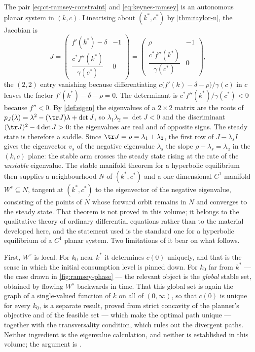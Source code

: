 \begin{remark}\label{rem:ct-saddle-path}
	The pair \eqref{eq:ct-ramsey-constraint} and \eqref{eq:keynes-ramsey} is an
	autonomous planar system in $(k,c)$. Linearising about $(k^{\ast},c^{\ast})$ by
	\autoref{thm:taylor-n}, the Jacobian is
	\[
		J=\begin{pmatrix}
			f'(k^{\ast})-\delta                            & -1 \\[2pt]
			\dfrac{c^{\ast}f''(k^{\ast})}{\gamma(c^{\ast})} & 0
		\end{pmatrix}
		=\begin{pmatrix}
			\rho                                           & -1 \\[2pt]
			\dfrac{c^{\ast}f''(k^{\ast})}{\gamma(c^{\ast})} & 0
		\end{pmatrix},
	\]
	the $(2,2)$ entry vanishing because differentiating
	$c\bigl(f'(k)-\delta-\rho\bigr)/\gamma(c)$ in $c$ leaves the factor
	$f'(k^{\ast})-\delta-\rho=0$. The determinant is
	$c^{\ast}f''(k^{\ast})/\gamma(c^{\ast})<0$ because
	$f''<0$. By \autoref{def:eigen} the eigenvalues of a $2\times2$ matrix are the
	roots of $p_J(\lambda)=\lambda^{2}-(\tr J)\lambda+\det J$, so
	$\lambda_1\lambda_2=\det J<0$ and the discriminant
	$(\tr J)^{2}-4\det J>0$: the eigenvalues are real and of opposite signs.
	The steady state is therefore a saddle. Since $\tr J=\rho=\lambda_1+\lambda_2$,
	the first row of $J-\lambda_{s}I$ gives the eigenvector $v_{s}$ of the negative
	eigenvalue $\lambda_{s}$ the slope $\rho-\lambda_{s}=\lambda_{u}$ in the
	$(k,c)$ plane: the stable arm crosses the steady state rising at the rate of
	the \emph{unstable} eigenvalue.
	The stable manifold theorem for a
	hyperbolic equilibrium then supplies a neighbourhood $N$ of
	$(k^{\ast},c^{\ast})$ and a one-dimensional $C^{1}$ manifold
	$W^{s}\subseteq N$, tangent at $(k^{\ast},c^{\ast})$ to the eigenvector of the
	negative eigenvalue, consisting of the points of $N$ whose forward orbit remains
	in $N$ and converges to the steady state. That theorem is not proved in this
	volume; it belongs to the qualitative theory of ordinary differential equations
	rather than to the material developed here, and the statement used is the
	standard one for a hyperbolic equilibrium of a $C^{1}$ planar system. Two
	limitations of it bear on what follows.

	First, $W^{s}$ is local. For $k_0$ near $k^{\ast}$ it determines $c(0)$
	uniquely, and that is the sense in which the initial consumption level is
	pinned down. For $k_0$ far from $k^{\ast}$ --- the case drawn in
	\autoref{fig:ramsey-phase} --- the relevant object is the \emph{global} stable
	set, obtained by flowing $W^{s}$ backwards in time. That this global set is
	again the graph of a single-valued function of $k$ on all of $(0,\infty)$, so
	that $c(0)$ is unique for every $k_0$, is a separate result, proved from
	strict concavity of the planner's objective and of the feasible set --- which
	make the optimal path unique --- together with the transversality condition,
	which rules out the divergent paths. Neither ingredient is the eigenvalue
	calculation, and neither is established in this volume; the argument is
	\textcite[Ch.~8]{acemoglu2009introduction}.


\end{remark}
